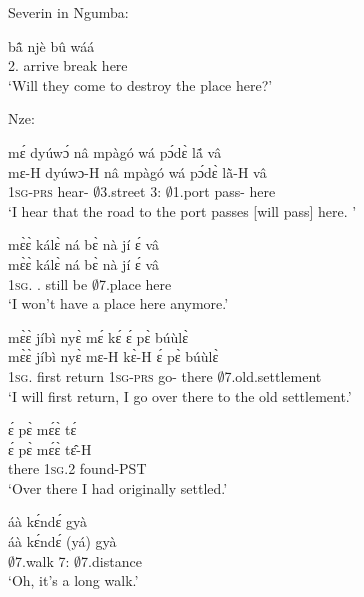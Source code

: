 \noindent Severin in Ngumba:

\begin{exe}[(C234)] 
\exC\label{65}
  \gll   bã̂ njè bû wáá \\
           2.{\FUT} arrive break here  \\
    \trans `Will they come to destroy the place here?'
\end{exe}

\noindent Nze:

\begin{exe}[(C234)]  
\exC\label{66} 
  \glll  mɛ́ dyúwɔ́ nâ mpàgó wá pɔ́dɛ̀ lã́ vâ \\
        mɛ-H dyúwɔ-H nâ mpàgó wá pɔ́dɛ̀ lã̀-H vâ \\
            1\textsc{sg}-\textsc{prs} hear-{\R} {\COMP} $\emptyset$3.street 3:{\ATT}  $\emptyset$1.port pass-{\R} here \\
    \trans `I hear that the road to the port passes [will pass] here. '
 
\exC\label{67}
  \glll  mɛ̀ɛ̀ kálɛ̀ ná bɛ̀ nà jí ɛ́ vâ \\
        mɛ̀ɛ̀ kálɛ̀ ná bɛ̀ nà jí ɛ́ vâ \\
           1\textsc{sg}.{\FUT} {\NEG}.{\FUT} still be {\COM} $\emptyset$7.place {\LOC} here  \\
    \trans `I won't have a place here anymore.'
 
\exC\label{68}
  \glll  mɛ̀ɛ̀ jíbì nyɛ̀ mɛ́ kɛ́ ɛ́ pɛ̀ búùlɛ̀ \\
        mɛ̀ɛ̀ jíbì nyɛ̀ mɛ-H kɛ̀-H ɛ́ pɛ̀ búùlɛ̀ \\
           1\textsc{sg}.{\FUT} first return 1\textsc{sg}-\textsc{prs} go-{\R} {\LOC} there $\emptyset$7.old.settlement  \\
    \trans `I will first return, I go over there to the old settlement.'
 
\exC\label{69}
  \glll   ɛ́ pɛ̀ mɛ́ɛ̀ tɛ́ \\
          ɛ́ pɛ̀ mɛ́ɛ̀ tɛ̂-H \\
           {\LOC} there 1\textsc{sg}.{\PST}2 found-PST \\
    \trans `Over there I had originally settled.'
 
\exC\label{70}
  \glll  áà kɛ́ndɛ́ gyà \\
          áà kɛ́ndɛ́ (yá) gyà \\
          {\EXCL} $\emptyset$7.walk 7:{\ATT} $\emptyset$7.distance   \\
    \trans `Oh, it's a long walk.'
 

\end{exe}
